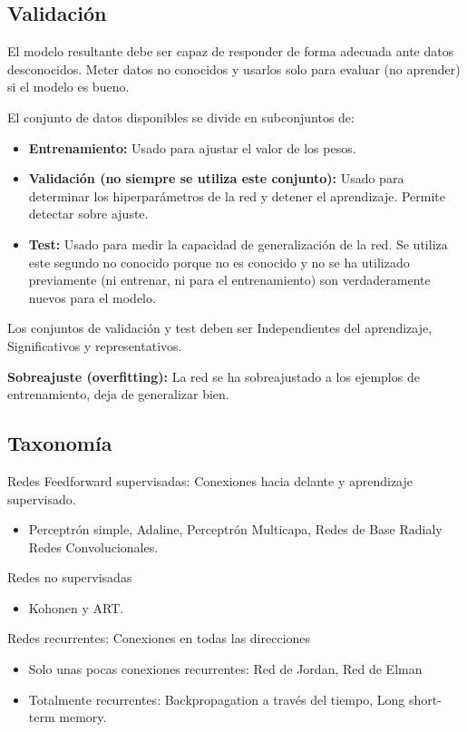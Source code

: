 \documentclass[12pt, twoside, openright]{report} %
\begin{document}
\subsection{Validación}
El modelo resultante debe ser capaz de responder de forma adecuada ante datos desconocidos. Meter datos no conocidos y usarlos solo para evaluar (no aprender) si el modelo es bueno.

El conjunto de datos disponibles se divide en subconjuntos de:
\begin{itemize}
	\item \textbf{Entrenamiento:} Usado para ajustar el valor de los pesos.
	\item \textbf{Validación (no siempre se utiliza este conjunto):} Usado para determinar los hiperparámetros de la red y detener el aprendizaje. Permite detectar sobre ajuste.
	\item \textbf{Test:} Usado para medir la capacidad de generalización de la red. Se utiliza este segundo no conocido porque no es conocido y no se ha utilizado previamente (ni entrenar, ni para el entrenamiento) son verdaderamente nuevos para el modelo.
\end{itemize}

Los conjuntos de validación y test deben ser Independientes del aprendizaje, Significativos y representativos.

\textbf{Sobreajuste (overfitting):} La red se ha sobreajustado a los ejemplos de entrenamiento, deja de generalizar bien.
\pagebreak

\subsection{Taxonomía}
Redes Feedforward supervisadas: Conexiones hacia delante y aprendizaje supervisado.
\begin{itemize}
	\item Perceptrón simple, Adaline, Perceptrón Multicapa, Redes de Base Radialy Redes Convolucionales.
\end{itemize}

Redes no supervisadas
\begin{itemize}
	\item Kohonen y ART.
\end{itemize}

Redes recurrentes: Conexiones en todas las direcciones
\begin{itemize}
	\item Solo unas pocas conexiones recurrentes: Red de Jordan, Red de Elman
	\item Totalmente recurrentes: Backpropagation a través del tiempo, Long short-term memory.
\end{itemize}
\end{document}

